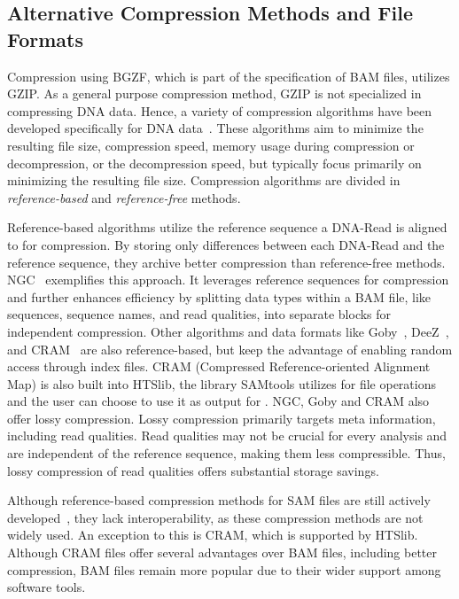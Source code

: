 \subsection{Alternative Compression Methods and File Formats}
Compression using BGZF, which is part of the specification of BAM files, utilizes GZIP. As a general purpose compression method, GZIP is not specialized in compressing DNA data. Hence, a variety of compression algorithms have been developed specifically for DNA data~\cite{hosseini_survey_2016}. These algorithms aim to minimize the resulting file size, compression speed, memory usage during compression or decompression, or the decompression speed, but typically focus primarily on minimizing the resulting file size. Compression algorithms are divided in \textit{reference-based} and \textit{reference-free} methods.

Reference-based algorithms utilize the reference sequence a DNA-Read is aligned to for compression. By storing only differences between each DNA-Read and the reference sequence, they archive better compression than reference-free methods. NGC~\cite{popitsch_ngc_2013} exemplifies this approach. It leverages reference sequences for compression and further enhances efficiency by splitting data types within a BAM file, like sequences, sequence names, and read qualities, into separate blocks for independent compression. Other algorithms and data formats like Goby~\cite{campagne_compression_2013}, DeeZ~\cite{hach_deez_2014}, and CRAM~\cite{fritz_efficient_2011} are also reference-based, but keep the advantage of enabling random access through index files. CRAM (Compressed Reference-oriented Alignment Map) is also built into HTSlib, the library SAMtools utilizes for file operations and the user can choose to use it as output for \sort. NGC, Goby and CRAM also offer lossy compression. Lossy compression primarily targets meta information, including read qualities. Read qualities may not be crucial for every analysis and are independent of the reference sequence, making them less compressible. Thus, lossy compression of read qualities offers substantial storage savings.

Although reference-based compression methods for SAM files are still actively developed~\cite{banerjee_abridge_2022}, they lack interoperability, as these compression methods are not widely used. An exception to this is CRAM, which is supported by HTSlib. Although CRAM files offer several advantages over BAM files, including better compression, BAM files remain more popular due to their wider support among software tools.

